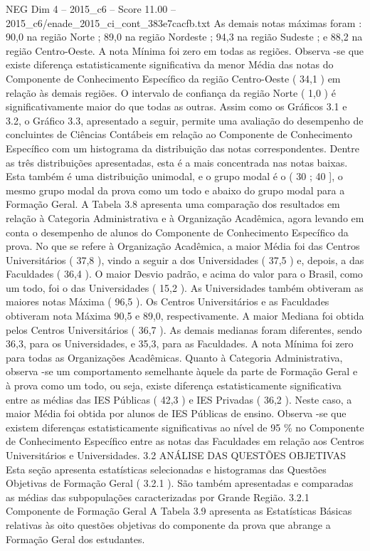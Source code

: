\begin{textsample}{NEG Dim 4 – 2015\_c6 – Score 11.00 – 2015\_c6/enade\_2015\_ci\_cont\_383e7cacfb.txt}
As demais notas máximas foram : 90,0 na região Norte ; 89,0 na região Nordeste ; 94,3 na região Sudeste ; e 88,2 na região Centro-Oeste.
A nota Mínima foi zero em todas as regiões.
Observa -se que existe diferença estatisticamente significativa da menor Média das notas do Componente de Conhecimento Específico da região Centro-Oeste ( 34,1 ) em relação às demais regiões.
O intervalo de confiança da região Norte ( 1,0 ) é significativamente maior do que todas as outras.
Assim como os Gráficos 3.1 e 3.2, o Gráfico 3.3, apresentado a seguir, permite uma avaliação do desempenho de concluintes de Ciências Contábeis em relação ao Componente de Conhecimento Específico com um histograma da distribuição das notas correspondentes.
Dentre as três distribuições apresentadas, esta é a mais concentrada nas notas baixas.
Esta também é uma distribuição unimodal, e o grupo modal é o ( 30 ; 40 ], o mesmo grupo modal da prova como um todo e abaixo do grupo modal para a Formação Geral.
A Tabela 3.8 apresenta uma comparação dos resultados em relação à Categoria Administrativa e à Organização Acadêmica, agora levando em conta o desempenho de alunos do Componente de Conhecimento Específico da prova.
No que se refere à Organização Acadêmica, a maior Média foi das Centros Universitários ( 37,8 ), vindo a seguir a dos Universidades ( 37,5 ) e, depois, a das Faculdades ( 36,4 ).
O maior Desvio padrão, e acima do valor para o Brasil, como um todo, foi o das Universidades ( 15,2 ).
As Universidades também obtiveram as maiores notas Máxima ( 96,5 ).
Os Centros Universitários e as Faculdades obtiveram nota Máxima 90,5 e 89,0, respectivamente.
A maior Mediana foi obtida pelos Centros Universitários ( 36,7 ).
As demais medianas foram diferentes, sendo 36,3, para os Universidades, e 35,3, para as Faculdades.
A nota Mínima foi zero para todas as Organizações Acadêmicas.
Quanto à Categoria Administrativa, observa -se um comportamento semelhante àquele da parte de Formação Geral e à prova como um todo, ou seja, existe diferença estatisticamente significativa entre as médias das IES Públicas ( 42,3 ) e IES Privadas ( 36,2 ).
Neste caso, a maior Média foi obtida por alunos de IES Públicas de ensino.
Observa -se que existem diferenças estatisticamente significativas ao nível de 95 \% no Componente de Conhecimento Específico entre as notas das Faculdades em relação aos Centros Universitários e Universidades. 3.2 ANÁLISE DAS QUESTÕES OBJETIVAS Esta seção apresenta estatísticas selecionadas e histogramas das Questões Objetivas de Formação Geral ( 3.2.1 ).
São também apresentadas e comparadas as médias das subpopulações caracterizadas por Grande Região. 3.2.1 Componente de Formação Geral A Tabela 3.9 apresenta as Estatísticas Básicas relativas às oito questões objetivas do componente da prova que abrange a Formação Geral dos estudantes.

\end{textsample}
